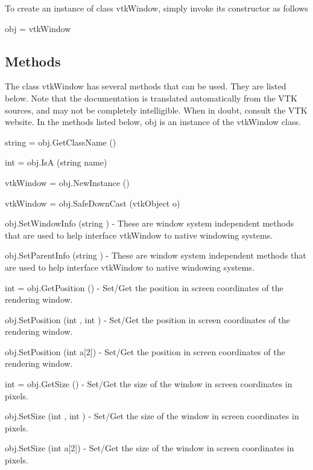To create an instance of class vtk\-Window, simply invoke its constructor as follows \begin{DoxyVerb}  obj = vtkWindow
\end{DoxyVerb}
 \hypertarget{vtkwidgets_vtkxyplotwidget_Methods}{}\subsection{Methods}\label{vtkwidgets_vtkxyplotwidget_Methods}
The class vtk\-Window has several methods that can be used. They are listed below. Note that the documentation is translated automatically from the V\-T\-K sources, and may not be completely intelligible. When in doubt, consult the V\-T\-K website. In the methods listed below, {\ttfamily obj} is an instance of the vtk\-Window class. 
\begin{DoxyItemize}
\item {\ttfamily string = obj.\-Get\-Class\-Name ()}  
\item {\ttfamily int = obj.\-Is\-A (string name)}  
\item {\ttfamily vtk\-Window = obj.\-New\-Instance ()}  
\item {\ttfamily vtk\-Window = obj.\-Safe\-Down\-Cast (vtk\-Object o)}  
\item {\ttfamily obj.\-Set\-Window\-Info (string )} -\/ These are window system independent methods that are used to help interface vtk\-Window to native windowing systems.  
\item {\ttfamily obj.\-Set\-Parent\-Info (string )} -\/ These are window system independent methods that are used to help interface vtk\-Window to native windowing systems.  
\item {\ttfamily int = obj.\-Get\-Position ()} -\/ Set/\-Get the position in screen coordinates of the rendering window.  
\item {\ttfamily obj.\-Set\-Position (int , int )} -\/ Set/\-Get the position in screen coordinates of the rendering window.  
\item {\ttfamily obj.\-Set\-Position (int a\mbox{[}2\mbox{]})} -\/ Set/\-Get the position in screen coordinates of the rendering window.  
\item {\ttfamily int = obj.\-Get\-Size ()} -\/ Set/\-Get the size of the window in screen coordinates in pixels.  
\item {\ttfamily obj.\-Set\-Size (int , int )} -\/ Set/\-Get the size of the window in screen coordinates in pixels.  
\item {\ttfamily obj.\-Set\-Size (int a\mbox{[}2\mbox{]})} -\/ Set/\-Get the size of the window in screen coordinates in pixels.  

\end{DoxyItemize}
